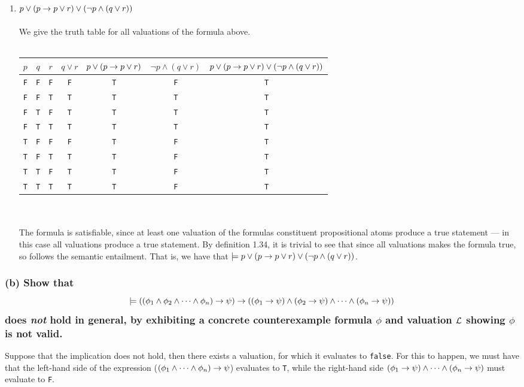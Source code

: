 \begin{enumerate}[i]
	\item
	{
	$p \lor (p \to p \lor r) \lor (\neg p \land (q \lor r))$ \\\\
	We give the truth table for all valuations of the formula above. \\\\
	\begin{tabular}{cccccc|c}
		$p$ & $q$ & $r$ &
		$q \lor r$ &
		$p \lor (p \to p \lor r)$ &
		$\neg p \land (q \lor r)$ &
		$p \lor (p \to p \lor r) \lor (\neg p \land (q \lor r))$ \\ \hline
		{\tt F} & {\tt F} & {\tt F} & {\tt F} & {\tt T} & {\tt F} & {\tt T} \\
		{\tt F} & {\tt F} & {\tt T} & {\tt T} & {\tt T} & {\tt T} & {\tt T} \\
		{\tt F} & {\tt T} & {\tt F} & {\tt T} & {\tt T} & {\tt T} & {\tt T} \\
		{\tt F} & {\tt T} & {\tt T} & {\tt T} & {\tt T} & {\tt T} & {\tt T} \\
		{\tt T} & {\tt F} & {\tt F} & {\tt F} & {\tt T} & {\tt F} & {\tt T} \\
		{\tt T} & {\tt F} & {\tt T} & {\tt T} & {\tt T} & {\tt F} & {\tt T} \\
		{\tt T} & {\tt T} & {\tt F} & {\tt T} & {\tt T} & {\tt F} & {\tt T} \\
		{\tt T} & {\tt T} & {\tt T} & {\tt T} & {\tt T} & {\tt F} & {\tt T} \\
	\end{tabular} \\\\
	The formula is satisfiable, since at least one valuation of the formulas
	constituent propositional atoms produce a true statement --- in this case
	all valuations produce a true statement. By definition 1.34\cite{HR}, it
	is trivial to see that since all valuations makes the formula true, so
	follows the semantic entailment. That is, we have that $\models p \lor
	(p \to p \lor r) \lor (\neg p \land (q \lor r))$.
	}
\end{enumerate}

\newpage
\subsubsection*{(b) \mdseries Show that \[\models \left((\phi_1 \land \phi_2
\land \dots \land \phi_n) \to \psi \right) \to \left( (\phi_1 \to \psi)
\land (\phi_2 \to \psi) \land \dots \land (\phi_n \to \psi) \right)\] does
{\it not} hold in general, by exhibiting a concrete counterexample formula
$\phi$ and valuation $\cal L$ showing $\phi$ is not valid.} 
Suppose that the implication does not hold, then there exists a valuation,
for which it evaluates to {\tt false}. For this to happen, we must have that
the left-hand side of the expression ($(\phi_1 \land \dots \land \phi_n) \to
\psi$) evaluates to {\tt T}, while the right-hand side $(\phi_1 \to \psi)
\land \dots \land (\phi_n \to \psi)$ must evaluate to {\tt F}.

